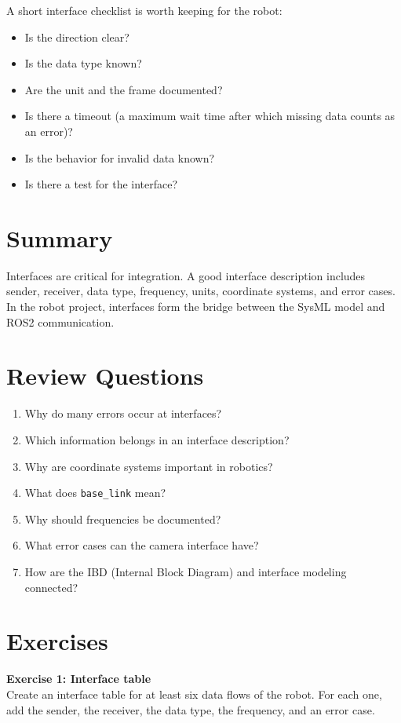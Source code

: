 A short interface checklist is worth keeping for the robot:

\begin{itemize}
    \item Is the direction clear?
    \item Is the data type known?
    \item Are the unit and the frame documented?
    \item Is there a timeout (a maximum wait time after which missing data counts as an error)?
    \item Is the behavior for invalid data known?
    \item Is there a test for the interface?
\end{itemize}

\section{Summary}
Interfaces are critical for integration. A good interface description includes sender, receiver, data type, frequency, units, coordinate systems, and error cases. In the robot project, interfaces form the bridge between the SysML model and ROS2 communication.

\section{Review Questions}
\begin{enumerate}
    \item Why do many errors occur at interfaces?
    \item Which information belongs in an interface description?
    \item Why are coordinate systems important in robotics?
    \item What does \texttt{base\_link} mean?
    \item Why should frequencies be documented?
    \item What error cases can the camera interface have?
    \item How are the IBD (Internal Block Diagram) and interface modeling connected?
\end{enumerate}

\section{Exercises}
\begin{uebungbox}
\textbf{Exercise 1: Interface table}\\
Create an interface table for at least six data flows of the robot. For each one, add the sender, the receiver, the data type, the frequency, and an error case.
\end{uebungbox}

